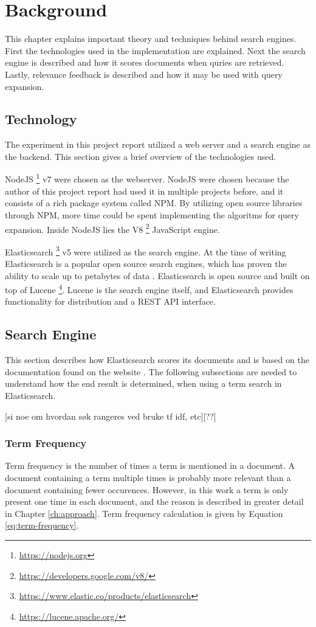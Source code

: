 \chapter{Background}
\label{ch:background}
This chapter explains important theory and techniques behind search engines.
First the technologies used in the implementation are explained.
Next the search engine is described and how it scores documents when quries are retrieved.
Lastly, relevance feedback is described and how it may be used with query expansion.

\section{Technology}
The experiment in this project report utilized a web server and a search engine as the backend.
This section gives a brief overview of the technologies used.

NodeJS \footnote{\url{https://nodejs.org}} v7 were chosen as the webserver.
NodeJS were chosen because the author of this project report had used it in multiple projects before,
and it consists of a rich package system called NPM.
By utilizing open source libraries through NPM, more time could be spent implementing the algoritms for query expansion.
Inside NodeJS lies the V8 \footnote{\url{https://developers.google.com/v8/}} JavaScript engine.

Elasticsearch \footnote{\url{https://www.elastic.co/products/elasticsearch}} v5 were utilized as the search engine.
At the time of writing Elasticsearch is a popular open source search engines, which has proven the ability to scale up to petabytes of data \cite{elasticsearch-scale}.
Elasticsearch is open source and built on top of Lucene \footnote{\url{https://lucene.apache.org/}}.
Lucene is the search engine itself,
and Elasticsearch provides functionality for distribution and a REST API interface.

\section{Search Engine}
This section describes how Elasticsearch scores its documents and is based on the documentation found on the website \cite{elasticsearch-scoring}.
The following subsections are needed to understand how the end result is determined, when using a term search in Elasticsearch.

[si noe om hvordan søk rangeres ved  bruke tf idf, etc][??]

\subsection{Term Frequency}
Term frequency is the number of times a term is mentioned in a document.
A document containing a term multiple times is probably more relevant than a document containing fewer occurences.
However, in this work a term is only present one time in each document, and the reason is described in greater detail in Chapter \ref{ch:approach}.
Term frequency calculation is given by Equation \ref{eq:term-frequency}.

